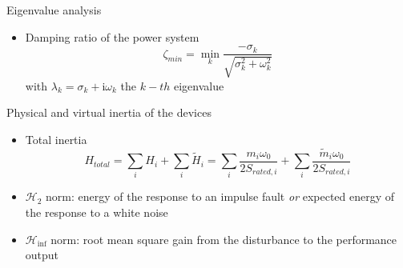 \documentclass[aspectratio=169, 12pt]{beamer}
\begin{document}
  \begin{frame}
  
    Eigenvalue analysis
    \begin{itemize}
      \item Damping ratio of the power system
      \begin{equation}
        \zeta_{min} = \min_{k}\frac{-\sigma_k}{\sqrt{\sigma_k^2 + \omega_k^2}}
      \end{equation}
      with $\lambda_k=\sigma_k + \text{i}\omega_k$ the $k-th$ eigenvalue
    \end{itemize}
    
    Physical and virtual inertia of the devices
  \begin{itemize}
    \item Total inertia
    \begin{equation}
      H_{total} = \sum_{i}H_i + \sum_{i} \tilde{H}_i = \sum_{i}\frac{m_i \omega_0}{2 S_{rated,i}} + \sum_{i} \frac{\tilde{m}_i \omega_0}{2 S_{rated,i}}
    \end{equation} 
  \end{itemize}
\end{frame}

\begin{frame}
  \begin{itemize}
    \item $\mathcal{H}_2$ norm: energy of the response to an impulse fault \textit{or} expected energy of the response to a white noise
    \item $\mathcal{H}_{\inf}$ norm: root mean square gain from the disturbance to the performance output
  \end{itemize}
\end{frame}
  
\end{document}
